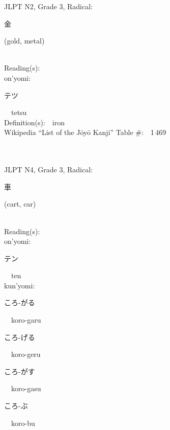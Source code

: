 \begin{multicols}{2}
{JLPT N2, Grade 3, Radical:\ \ {\begin{CJK}{UTF8}{min} 金 \end{CJK}} (gold, metal) } \\
Reading(s):\ \ \\
{\hspace*{1em}}on'yomi:\ \ \\
{\hspace*{2em}}{\begin{CJK}{UTF8}{min} テツ \end{CJK}}\ \ tetsu\ \ \\
Definition(s):\ \ iron \\
Wikipedia ``List of the J\=oy\=o Kanji'' Table \#:\ \ 1\,469 \\
\ \ \\
{\fontsize{34pt}{40pt}  }\ \ \\  %
{JLPT N4, Grade 3, Radical:\ \ {\begin{CJK}{UTF8}{min} 車 \end{CJK}} (cart, car) } \\
Reading(s):\ \ \\
{\hspace*{1em}}on'yomi:\ \ \\
{\hspace*{2em}}{\begin{CJK}{UTF8}{min} テン \end{CJK}}\ \ ten\ \ \\
{\hspace*{1em}}kun'yomi:\ \ \\
{\hspace*{2em}}{\begin{CJK}{UTF8}{min} ころ-がる \end{CJK}}\ \ koro-garu\ \ \\
{\hspace*{2em}}{\begin{CJK}{UTF8}{min} ころ-げる \end{CJK}}\ \ koro-geru\ \ \\
{\hspace*{2em}}{\begin{CJK}{UTF8}{min} ころ-がす \end{CJK}}\ \ koro-gasu\ \ \\
{\hspace*{2em}}{\begin{CJK}{UTF8}{min} ころ-ぶ \end{CJK}}\ \ koro-bu\ \ \\

\end{multicols}
